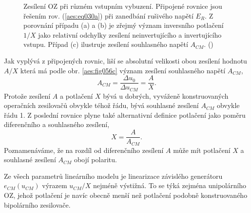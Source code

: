         \begin{figure}[ht!]  %
          \centering
            {}
          \newline                                                      
            {}        
          \newline                                                 
            {}             
          \caption{Zesílení OZ při různém vstupním vybuzení. Připojené rovnice jsou řešením rov.
                  (\ref{aes:eq030a}) při zanedbání rušivého napětí \(E_R\). Z porovnání případu (a)
                  a (b) je zřejmý význam inversního potlačení \(1/X\) jako relativní odchylky 
                  zesílení neinvertujícího a invertujícího vstupu. Případ (c) ilustruje zesílení 
                  souhlasného napětí \(A_{CM}\). (\cite[s.~28]{Dostal})}
          \label{aes:fig056}
        \end{figure}

        Jak vyplývá z připojených rovnic, liší se absolutní velikosti obou zesílení hodnotu \(A/X\)
        která má podle obr. \ref{aes:fig056c} význam zesílení souhlasného napětí \(A_{CM}\),
        \begin{equation*}
          A_{CM} = \dfrac{\Delta u_0}{\Delta u_{CM}} = \dfrac{A}{X}.
        \end{equation*}
        Protože zesílení \(A\) a potlačení \(X\) bývá u dobrých, vyváženě konstruovaných operačních
        zesilovačů obvykle téhož řádu, bývá souhlasné zesílení \(A_{CM}\) obvykle řádu 1. Z poslední
        rovnice plyne také alternativní definice potlačení jako poměru diferenčního a souhlasného
        zesílení,
        \begin{equation*}
          X = \dfrac{A}{A_{CM}}.
        \end{equation*}
        Poznamenáváme, že na rozdíl od diferenčního zesílení \(A\) může mít potlačení \(X\) a
        souhlasné zesílení \(A_{CM}\) obojí polaritu.

        Ze všech parametrů lineárního modelu je linearizace závislého generátoru \(e_{CM}(u_{CM})\)
        výrazem \(u_{CM}/X\) nejméně výstižná. To se týká zejména unipolárního OZ, jehož potlačení
        je navíc obecně menší než potlačení podobně konstruovaného bipolárního zesilovače.

